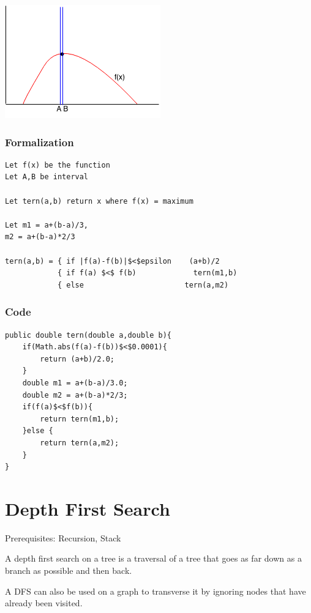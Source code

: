 \documentclass[11pt,oneside]{book}
\makeatletter
\def\maxwidth#1{\ifdim\Gin@nat@width>#1 #1\else\Gin@nat@width\fi}
\makeatother
\begin{document}
\includegraphics[width=\maxwidth{\textwidth}]{ternarysearch7.png}

\subsubsection{Formalization}

\begin{lstlisting}
Let f(x) be the function 
Let A,B be interval

Let tern(a,b) return x where f(x) = maximum

Let m1 = a+(b-a)/3,
m2 = a+(b-a)*2/3

tern(a,b) = { if |f(a)-f(b)|$<$epsilon    (a+b)/2 
            { if f(a) $<$ f(b)             tern(m1,b)
            { else                       tern(a,m2)
\end{lstlisting}

\subsubsection{Code}

\begin{lstlisting}
public double tern(double a,double b){
    if(Math.abs(f(a)-f(b))$<$0.0001){
        return (a+b)/2.0;
    }
    double m1 = a+(b-a)/3.0;
    double m2 = a+(b-a)*2/3;
    if(f(a)$<$f(b)){
        return tern(m1,b);
    }else {
        return tern(a,m2);
    }
}
\end{lstlisting}

        \section{ Depth First Search }
        

Prerequisites: Recursion, Stack

A depth first search on a tree is a traversal of a tree that goes as far down as a branch as possible and then back.

A DFS can also be used on a graph to transverse it by ignoring nodes that have already been visited.
\end{document}
